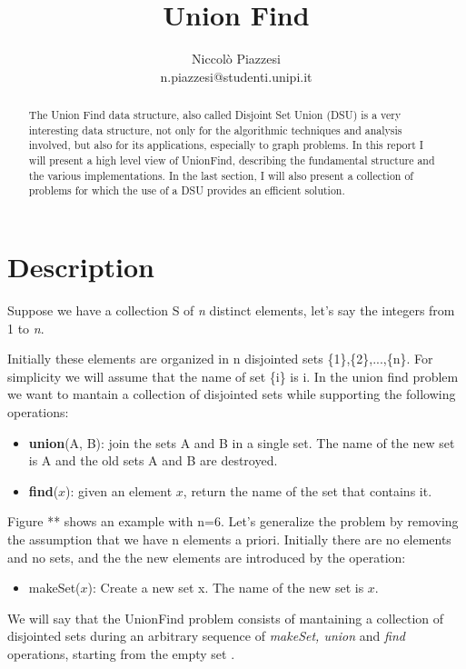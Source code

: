\documentclass{article}
\begin{document}
\title{ \textbf{Union Find}}
\author{Niccolò Piazzesi\\n.piazzesi@studenti.unipi.it}
\date{}
\maketitle
\begin{abstract}
The Union Find data structure, also called Disjoint Set Union (DSU) is a very interesting data structure, not 
only  for the algorithmic techniques and  analysis involved, but also for its applications, especially to graph problems. In this
report I will present a high level view of UnionFind, describing the fundamental structure and the various implementations. In the last section, I will also present
a collection of problems for which the use of a DSU provides an efficient solution.
\end{abstract}
\section{Description}
Suppose we have a collection S of \emph{n} distinct elements, let's say the integers from 1 to \emph{n}. 

Initially these elements
are organized in n disjointed sets \{1\},\{2\},...,\{n\}. For simplicity we will assume that the name of set \{i\}
is i. In the union find problem we want to mantain a collection of disjointed sets while supporting the following operations:
\begin{itemize}
    \item \textbf{union}(A, B): join the sets A and B in a single set. The name of the new set is A and the old sets A and B are destroyed.
    \item \textbf{find}($x$): given an element $x$, return the name of the set that contains it.
\end{itemize}
Figure ** shows an example  with n=6. Let's generalize the problem by removing the assumption that we have n elements a priori.
Initially there are no elements and no sets, and the the new elements are introduced by the operation:\begin{itemize}
    \item makeSet($x$): Create a new set {x}. The name of the new set is $x$.
\end{itemize}
We will say that the UnionFind problem consists of mantaining a collection of disjointed sets during 
an arbitrary sequence of \emph{makeSet, union} and \emph{find} operations, starting from the empty set \cite{demetrescu}.
\end{document}
